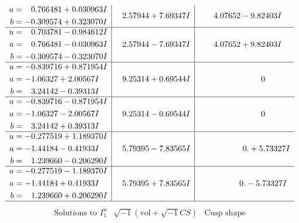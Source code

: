 \documentclass[1p]{elsarticle_modified}
\theoremstyle{definition}
\newcommand{\I}{\sqrt{-1}}
\begin{document}
$$\begin{array}{c|c|c}
\begin{aligned}
a &= \phantom{-}0.766481 + 0.030963 I \\
b &= -0.309574 + 0.323070 I\end{aligned}
 & \phantom{-}2.57944 + 7.69347 I & \phantom{-}4.07652 - 9.82403 I \\ \hline\begin{aligned}
u &= \phantom{-}0.703781 - 0.984612 I \\
a &= \phantom{-}0.766481 - 0.030963 I \\
b &= -0.309574 - 0.323070 I\end{aligned}
 & \phantom{-}2.57944 - 7.69347 I & \phantom{-}4.07652 + 9.82403 I \\ \hline\begin{aligned}
u &= -0.839716 + 0.871954 I \\
a &= -1.06327 + 2.00567 I \\
b &= \phantom{-}3.24142 - 0.39313 I\end{aligned}
 & \phantom{-}9.25314 + 0.69544 I & \phantom{-0.000000 } 0 \\ \hline\begin{aligned}
u &= -0.839716 - 0.871954 I \\
a &= -1.06327 - 2.00567 I \\
b &= \phantom{-}3.24142 + 0.39313 I\end{aligned}
 & \phantom{-}9.25314 - 0.69544 I & \phantom{-0.000000 } 0 \\ \hline\begin{aligned}
u &= -0.277519 + 1.189370 I \\
a &= -1.44184 - 0.41933 I \\
b &= \phantom{-}1.239660 - 0.206290 I\end{aligned}
 & \phantom{-}5.79395 - 7.83565 I & \phantom{-0.000000 -}0. + 5.73327 I \\ \hline\begin{aligned}
u &= -0.277519 - 1.189370 I \\
a &= -1.44184 + 0.41933 I \\
b &= \phantom{-}1.239660 + 0.206290 I\end{aligned}
 & \phantom{-}5.79395 + 7.83565 I & \phantom{-0.000000 } 0. - 5.73327 I\\
 \hline 
 \end{array}$$\newpage$$\begin{array}{c|c|c}  
\text{Solutions to }I^u_{1}& \I (\text{vol} + \sqrt{-1}CS) & \text{Cusp shape}\\
 \hline 
\begin{aligned}

\end{aligned}
\end{array}$$
\end{document}
